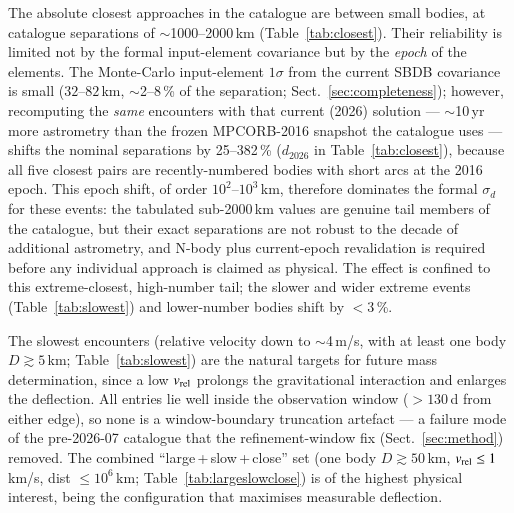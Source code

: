 \documentclass{aa}
\begin{document}
The absolute closest approaches in the catalogue are between small bodies, at
catalogue separations of $\sim$1000--2000\,km (Table~\ref{tab:closest}). Their
reliability is limited not by the formal input-element covariance but by the
\emph{epoch} of the elements. The Monte-Carlo input-element $1\sigma$ from the
current SBDB covariance is small ($32$--$82$\,km, $\sim$2--8\,\% of the
separation; Sect.~\ref{sec:completeness}); however, recomputing the \emph{same}
encounters with that current (2026) solution --- $\sim$10\,yr more astrometry than
the frozen MPCORB-2016 snapshot the catalogue uses --- shifts the nominal
separations by 25--382\,\% ($d_{2026}$ in Table~\ref{tab:closest}), because all
five closest pairs are recently-numbered bodies with short arcs at the 2016 epoch.
This epoch shift, of order $10^2$--$10^3$\,km, therefore dominates the formal
$\sigma_d$ for these events: the tabulated sub-2000\,km values are genuine tail
members of the catalogue, but their exact separations are not robust to the decade
of additional astrometry, and N-body plus current-epoch revalidation is required
before any individual approach is claimed as physical. The effect is confined to
this extreme-closest, high-number tail; the slower and wider extreme events
(Table~\ref{tab:slowest}) and lower-number bodies shift by $<3$\,\%.

The slowest encounters (relative velocity down to $\sim$4\,m/s, with at least
one body $D\gtrsim5$\,km; Table~\ref{tab:slowest}) are the natural targets for
future mass determination, since a low $v_{\rm rel}$ prolongs the gravitational
interaction and enlarges the deflection. All entries lie well inside the
observation window ($>130$\,d from either edge), so none is a window-boundary
truncation artefact --- a failure mode of the pre-2026-07 catalogue that the
refinement-window fix (Sect.~\ref{sec:method}) removed. The combined
``large\,+\,slow\,+\,close'' set (one body $D\gtrsim50$\,km,
$v_{\rm rel}\leq1$\,km/s, dist $\leq10^6$\,km; Table~\ref{tab:largeslowclose}) is
of the highest physical interest, being the configuration that maximises
measurable deflection.
\end{document}
